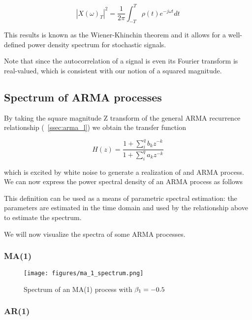 $$|X(\omega)_T|^2 = \frac{1}{2\pi}\int_{-T}^{T} \rho(t)e^{-j \omega t}dt$$

This results is known as the Wiener-Khinchin theorem and it allows for a
well-defined power density spectrum for stochastic signals.

Note that since the autocorrelation of a signal is even its Fourier transform
is real-valued, which is consistent with our notion of a squared magnitude.

\subsection{Spectrum of ARMA processes}

By taking the square magnitude Z transform of the general ARMA recurrence
relationship (~\ref{ssec:arma_l}) we obtain the transfer function

$$ H(z) = \frac{1 + \sum_{i}^{q} b_k z^{-k}}{1 + \sum_{i}^{q} a_k z^{-k}} $$

which is excited by white noise to generate a realization of and ARMA
process. We can now express the power spectral density of an ARMA process as
follows


This definition can be used as a means of parametric spectral estimation: the
parameters are estimated in the time domain and used by the relationship
above to estimate the spectrum.

We will now visualize the spectra of some ARMA processes.

\subsubsection{MA(1)}

\begin{figure}[H]
    \centering
    \texttt{[image: figures/ma\_1\_spectrum.png]}
    \caption{Spectrum of an MA(1) process with
    $\protect \beta_1 = -0.5$}
    \label{fig:ma_1_spectrum}
\end{figure}

\subsubsection{AR(1)}


